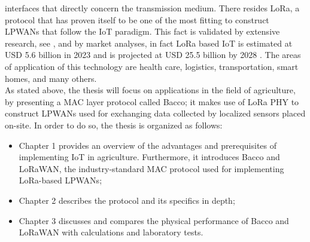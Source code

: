 interfaces that directly concern the transmission medium. There resides LoRa, a protocol that has proven itself to be one
of the most fitting to construct \glspl{LPWAN} that follow the \gls{IoT} paradigm. This fact is validated by
extensive research, see \cite{lora_research_1} \cite{lora_research_2}, and by market analyses, in fact LoRa based
\gls{IoT} is estimated at USD 5.6 billion in 2023 and is projected at USD 25.5 billion by 2028 \cite{lora_marketshare}.
The areas of application of this technology are health care, logistics, transportation, smart homes, and many
others.\\
As stated above, the thesis will focus on applications in the field of agriculture, by presenting a \gls{MAC} layer
protocol called Bacco; it makes use of LoRa \gls{PHY} to construct \glspl{LPWAN} used for exchanging data collected by
localized sensors placed on-site. In order to do so, the thesis is organized as follows:
\begin{itemize}
    \item Chapter 1 provides an overview of the advantages and prerequisites of implementing \gls{IoT} in agriculture.
        Furthermore, it introduces Bacco and \gls{LoRaWAN}, the industry-standard \gls{MAC} protocol used for
        implementing LoRa-based \glspl{LPWAN};
    \item Chapter 2 describes the protocol and its specifics in depth;
    \item Chapter 3 discusses and compares the physical performance of Bacco and \gls{LoRaWAN} with calculations and
        laboratory tests.
\end{itemize}
